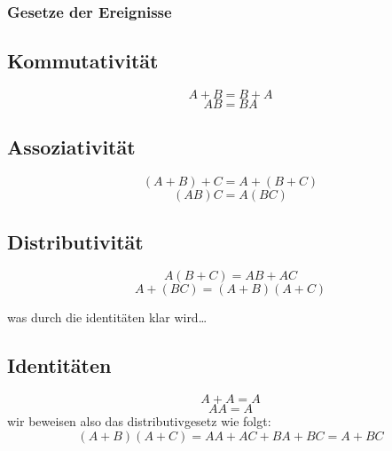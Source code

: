 \documentclass[a4paper]{article}
\theoremstyle{definition}
\theoremstyle{remark}
\begin{document}
\subsubsection{Gesetze der Ereignisse}
\label{ssub:gesetze_der_ereignisse}

\subsection*{Kommutativität}
\label{sub:kommutativitat}
\begin{equation*}
A+B=B+A
\end{equation*}
\begin{equation*}
AB=BA
\end{equation*}

\subsection*{Assoziativität}
\label{sub:assoziativitat}
\begin{equation*}
(A+B)+C=A+(B+C)
\end{equation*}
\begin{equation*}
(AB)C=A(BC)
\end{equation*}

\subsection*{Distributivität}
\label{sub:distributivitat}
\begin{equation*}
A(B+C)=AB+AC
\end{equation*}
\begin{equation*}
A+(BC)=(A+B)(A+C)
\end{equation*}

was durch die identitäten klar wird\ldots
\subsection*{Identitäten}
\label{sub:identitaten}
\begin{equation*}
A+A=A
\end{equation*}
\begin{equation*}
AA=A
\end{equation*}
wir beweisen also das distributivgesetz wie folgt:\\
\begin{equation*}
(A+B)(A+C)=AA+AC+BA+BC=A+BC
\end{equation*}
\end{document}
